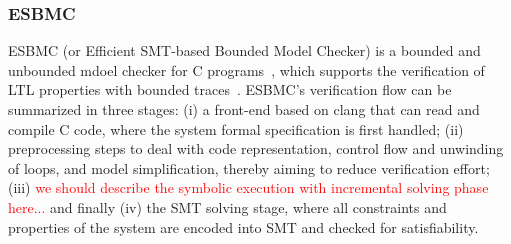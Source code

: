 \documentclass[10pt,conference]{IEEEtran}
\begin{document}
\subsubsection{ESBMC}
ESBMC (or Efficient SMT-based Bounded Model Checker) is a bounded and unbounded mdoel checker for C programs~\cite{esbmc2018}, which supports the verification of LTL properties with bounded traces~\cite{DBLP:journals/sosym/MorseCN015}. ESBMC's verification flow can be summarized in three stages: (i) a front-end based on clang that can read and compile C code, where the system formal specification is first handled; (ii) preprocessing steps to deal with code representation, control flow and unwinding of loops, and model simplification, thereby aiming to reduce verification effort; (iii) \textcolor{red}{we should describe the symbolic execution with incremental solving phase here...} and finally (iv) the SMT solving stage, where all constraints and properties of the system are encoded into SMT and checked for satisfiability. 
\end{document}
